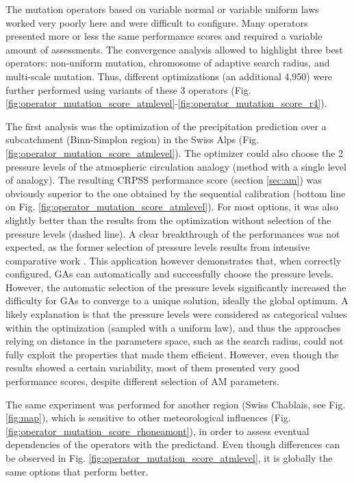 \documentclass{ametsoc}
\begin{document}
The mutation operators based on variable normal or variable uniform laws worked very poorly here and were difficult to configure. Many operators presented more or less the same performance scores and required a variable amount of assessments. The convergence analysis \citep[see][]{Horton2012a} allowed to highlight three best operators: non-uniform mutation, chromosome of adaptive search radius, and multi-scale mutation. Thus, different optimizations (an additional 4,950) were further performed using variants of these 3 operators (Fig. \ref{fig:operator_mutation_score_atmlevel}-\ref{fig:operator_mutation_score_r4}).

The first analysis was the optimization of the precipitation prediction over a subcatchment (Binn-Simplon region) in the Swiss Alps (Fig. \ref{fig:operator_mutation_score_atmlevel}). The optimizer could also choose the 2 pressure levels of the atmospheric circulation analogy (method with a single level of analogy). The resulting CRPSS performance score (section \ref{sec:am}) was obviously superior to the one obtained by the sequential calibration (bottom line on Fig. \ref{fig:operator_mutation_score_atmlevel}). For most options, it was also slightly better than the results from the optimization without selection of the pressure levels (dashed line). A clear breakthrough of the performances was not expected, as the former selection of pressure levels results from intensive comparative work \citep{Bontron2004}. This application however demonstrates that, when correctly configured, GAs can automatically and successfully choose the pressure levels. However, the automatic selection of the pressure levels significantly increased the difficulty for GAs to converge to a unique solution, ideally the global optimum. A likely explanation is that the pressure levels were considered as categorical values within the optimization (sampled with a uniform law), and thus the approaches relying on distance in the parameters space, such as the search radius, could not fully exploit the properties that made them efficient. However, even though the results showed a certain variability, most of them presented very good performance scores, despite different selection of AM parameters.

The same experiment was performed for another region (Swiss Chablais, see Fig. \ref{fig:map}), which is sensitive to other meteorological influences (Fig. \ref{fig:operator_mutation_score_rhoneamont}), in order to assess eventual dependencies of the operators with the predictand. Even though differences can be observed in Fig. \ref{fig:operator_mutation_score_atmlevel}, it is globally the same options that perform better.
\end{document}
